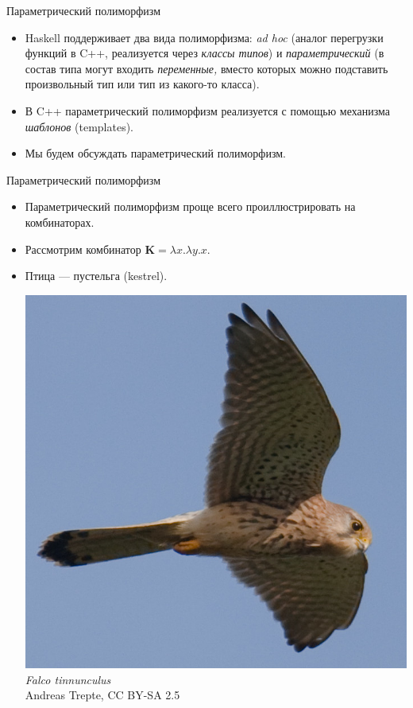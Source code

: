 \documentclass[xcolor=dvipsnames]{beamer}
\newcommand{\Kx}{\mathbf{K}}
\begin{document}
\begin{frame}{Параметрический полиморфизм}

\begin{itemize}[<+->]
 \item Haskell поддерживает два вида полиморфизма: {\em ad hoc} (аналог перегрузки функций в C++, реализуется через {\em классы типов}) и {\em параметрический} (в состав типа могут входить {\em переменные,} вместо которых можно подставить произвольный тип или тип из какого-то класса).
 \item В C++ параметрический полиморфизм реализуется с помощью механизма {\em шаблонов} (templates).
 \item Мы будем обсуждать параметрический полиморфизм.
\end{itemize}

 
\end{frame}

\begin{frame}{Параметрический полиморфизм}

\begin{itemize}[<+->]
 \item Параметрический полиморфизм проще всего проиллюстрировать на комбинаторах.
 \item Рассмотрим комбинатор $\Kx = \lambda x. \lambda y. x$.
 \item Птица --- пустельга (kestrel).
  \begin{center}
  \vspace*{3pt}
    \includegraphics[scale=.6]{Kestrel.jpg}\\ \vspace*{-3pt}
    {\sl Falco tinnunculus}\\
    \vspace*{-8pt}
    {\tiny\color{gray}\sf Andreas Trepte, CC BY-SA 2.5}
  \end{center}
\end{itemize}
 
\end{frame}
\end{document}
